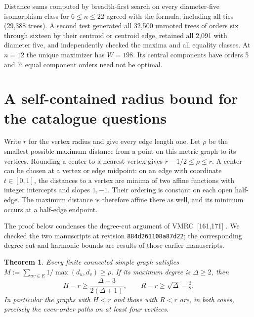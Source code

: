\documentclass[11pt,a4paper]{article}
\newtheorem{theorem}{Theorem}[section]
\begin{document}
Distance sums computed by breadth-first search on every diameter-five isomorphism class for $6\le n\le22$ agreed with the formula, including all ties (29,388 trees). A second test generated all 32,500 unrooted trees of orders six through sixteen by their centroid or centroid edge, retained all 2,091 with diameter five, and independently checked the maxima and all equality classes. At $n=12$ the unique maximizer has $W=198$. Its central components have orders 5 and 7: equal component orders need not be optimal.

\section{A self-contained radius bound for the catalogue questions}
\label{sec:radius-certified}
Write $r$ for the vertex radius and give every edge length one. Let $\rho$
be the smallest possible maximum distance from a point on this metric
graph to its vertices. Rounding a center to a nearest vertex gives
$r-1/2\le\rho\le r$. A center can be chosen at a vertex or edge midpoint:
on an edge with coordinate $t\in[0,1]$, the distances to a vertex
are minima of two affine functions with integer intercepts and slopes
$1,-1$. Their ordering is constant on each open half-edge. The maximum
distance is therefore affine there as well, and its minimum occurs at a
half-edge endpoint.

The proof below condenses the degree-cut argument of VMRC~[161,171]
\cite{cat-rad,cat-harm}. We checked the two manuscripts at revision
\texttt{884d261108a87d22}; the corresponding degree-cut and harmonic
bounds are results of those earlier manuscripts.
\begin{theorem}\label{thm:radius-certified}
Every finite connected simple graph satisfies
$M:=\sum_{uv\in E}1/\max(d_u,d_v)\ge\rho$.
If its maximum degree is $\Delta\ge2$, then
\[
 H-r\ge\frac{\Delta-3}{2(\Delta+1)},\qquad
 R-r\ge\sqrt{\Delta}-\tfrac32.
\]
In particular the graphs with $H<r$ and those with $R<r$ are, in both
cases, precisely the even-order paths on at least four vertices.
\end{theorem}
\end{document}

